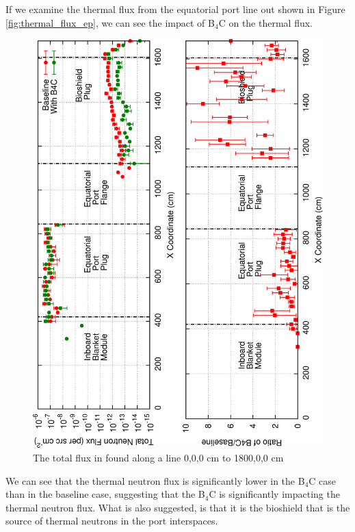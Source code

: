 \documentclass[12pt]{article}
\begin{document}
\newpage
\clearpage
If we examine the thermal flux from the equatorial port line out shown in Figure 
\ref{fig:thermal_flux_ep}, we can see the impact of B$_4$C on the thermal flux.
\begin{figure}[ht!]
  \centering
  \includegraphics[angle=-90,clip,scale=0.15]{../plots/neutron/thermal_flux_ep.png}     
  \caption{The total flux in found along a line 0,0,0 cm to 1800,0,0 cm}
  \label{fig:thermal_flux_up}
\end{figure}
We can see that the thermal neutron flux is significantly lower
in the B$_4$C case than in the baseline case, suggesting that the B$_4$C is significantly
impacting the thermal neutron flux. What is also suggested, is that it is the bioshield
that is the source of thermal neutrons in the port interspaces.
\end{document}
